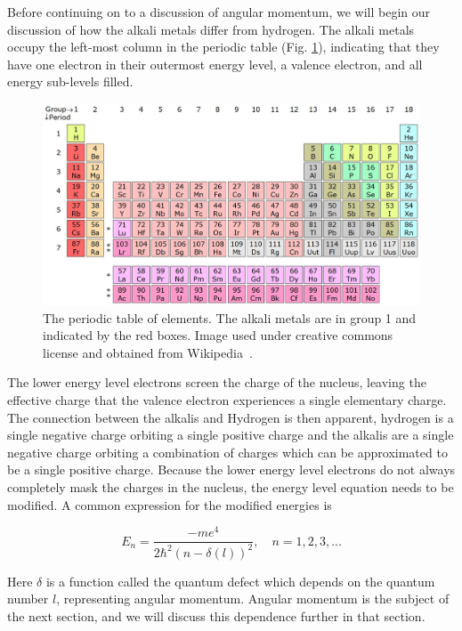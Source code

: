 \documentclass[12pt]{article}
\begin{document}
		Before continuing on to a discussion of angular momentum, 
		we will begin our discussion of how the alkali metals differ
		from hydrogen. The alkali metals occupy the left-most
		column in the periodic table (Fig. \ref{periodicTable}), 
		indicating that they have one
		electron in their outermost energy level, a valence electron,
		and all energy sub-levels filled. 
		\begin{figure}[ht]
			\centering
			\includegraphics[width=\textwidth]{periodicTable}
			\caption{\label{periodicTable}The periodic table 
				of elements. The alkali metals 
			are in group 1 and indicated by the red boxes. Image
			used under creative commons license and obtained
			from Wikipedia~\cite{periodicWiki}.}
		\end{figure}
		The lower energy level
		electrons screen the charge of the nucleus, leaving the effective
		charge that the valence electron experiences 
        a single elementary charge. The connection between the alkalis
		and Hydrogen is then apparent, hydrogen is a single negative charge
		orbiting a single positive charge and the alkalis are a single
		negative charge orbiting a combination of charges which 
		can be approximated to be a single positive charge.
        Because the lower energy level electrons do not always completely
		mask the charges in the nucleus, the energy level equation 
		needs to be modified. A common
        expression for the modified energies is

		\begin{equation}\label{modEnergy}
            E_n=\frac{-me^4}{2\hbar^2(n-\delta(l))^2},\quad n=1,2,3,...
		\end{equation}

        Here $\delta$ is a function called the quantum defect which
        depends on the quantum number $l$, representing angular momentum.
        Angular momentum is the subject of the next section, and we 
        will discuss this dependence further in that section.
\end{document}
